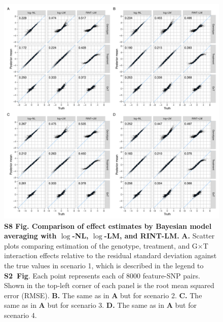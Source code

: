 \documentclass[11pt]{article}
\newcommand{\GxT}{G$\times$T\xspace}
\newcommand{\sfigroccmcmc}{\textbf{S2~Fig}\xspace}
\begin{document}
\begin{figure}[!ht]
\begin{center}
  \includegraphics[width=1\textwidth]{png/sim_est_mcmc_bs.png}
\end{center}  
\caption{
  {\bf
    S8 Fig.
    Comparison of effect estimates by Bayesian model averaging with $\log$-NL, $\log$-LM, and RINT-LM.}
\textbf{A.} Scatter plots comparing estimation of the genotype, treatment, and \GxT interaction effects relative to the residual standard deviation against the true values in scenario 1, which is described in the legend to \sfigroccmcmc.
Each point represents each of 8000 feature-SNP pairs.
Shown in the top-left corner of each panel is the root mean squared error (RMSE).
\textbf{B.} The same as in \textbf{A} but for scenario 2.
\textbf{C.} The same as in \textbf{A} but for scenario 3.
\textbf{D.} The same as in \textbf{A} but for scenario 4.
}
\label{s-fig:sim-est-mcmc-bs}
\end{figure}
\end{document}
